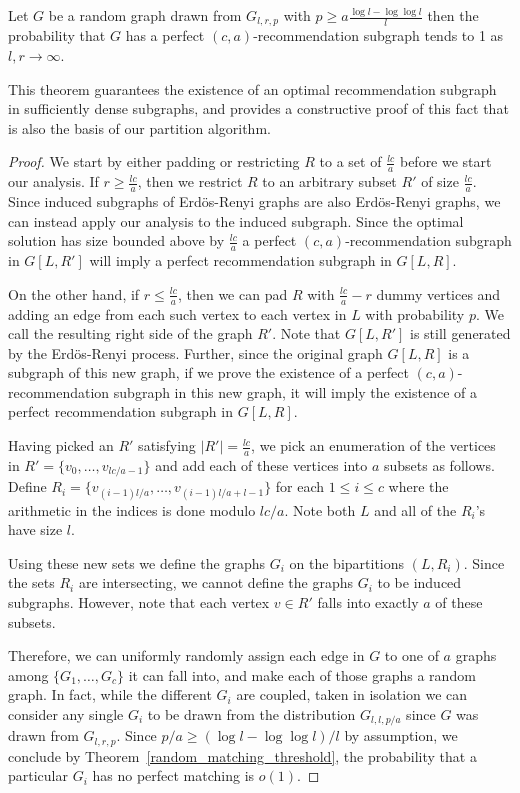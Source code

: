 \begin{thm}\label{perfect}
Let $G$ be a random graph drawn from $G_{l, r, p}$ with $p\geq a\frac{\log l-\log\log
l}{l}$ then the probability that $G$ has a perfect $(c, a)$-recommendation
subgraph tends to 1 as $l,r\to\infty$.
\end{thm}

This theorem guarantees the existence of an optimal recommendation subgraph in sufficiently dense subgraphs, and provides a constructive proof of this fact that is also the basis of our partition algorithm. \vs

\begin{proof}
We start by either padding or restricting $R$ to a set of $\frac{lc}{a}$ before we
start our analysis. If $r\geq\frac{lc}{a}$, then we restrict $R$
to an arbitrary subset $R'$ of size $\frac{lc}{a}$. Since induced subgraphs of
Erd\"{o}s-Renyi graphs are also Erd\"{o}s-Renyi graphs, we can instead
apply our analysis to the induced subgraph. Since the optimal
solution has size bounded above by $\frac{lc}{a}$ a perfect $(c,a)$-recommendation
subgraph in $G[L,R']$ will imply a perfect recommendation subgraph in $G[L,R]$. \vs

On the other hand, if $r \leq\frac{lc}{a}$, then we can pad $R$ with $\frac{lc}{a}-r$
dummy vertices and adding an edge from each such vertex to each vertex in $L$
with probability $p$. We call the resulting right side of the graph $R'$.
Note that $G[L,R']$ is still generated by the Erd\"{o}s-Renyi process. Further,
since the original graph $G[L,R]$ is a subgraph of this new graph, if we prove
the existence of a perfect $(c,a)$-recommendation subgraph in this new graph, it
will imply the existence of a perfect recommendation subgraph in $G[L,R]$. \vs

Having picked an $R'$ satisfying $|R'|=\frac{lc}{a}$, we pick an enumeration
of the vertices in $R'=\{v_0,\ldots, v_{lc/a-1}\}$
and add each of these vertices into $a$ subsets as follows. Define
$R_i = \{v_{(i-1)l/a}, \ldots, v_{(i-1)l/a+l-1}\}$ for each $1\leq i\leq c$ where
the arithmetic in the indices is done modulo $lc/a$. Note both $L$ and all of
the $R_i$'s have size $l$. \vs

Using these new sets we define the graphs $G_i$ on the bipartitions
$(L, R_i)$. Since the sets $R_i$ are intersecting, we cannot define the
graphs $G_i$ to be induced subgraphs. However, note that each vertex $v\in R'$
falls into exactly $a$ of these subsets. \vs

Therefore, we can uniformly randomly assign each edge in $G$ to one of $a$ graphs among $\{G_1,\ldots, G_c\}$ it can fall into,
and make each of those graphs a random graph. In fact, while the different
$G_i$ are coupled, taken in isolation we can consider any single $G_i$ to be
drawn from the distribution $G_{l,l,p/a}$ since $G$ was drawn from $G_{l,r,p}$.
Since $p/a \geq (\log l - \log\log l)/l$ by assumption, we conclude by
Theorem~\ref{random_matching_threshold}, the probability that a particular
$G_i$ has no perfect matching is $o(1)$. \vs


\end{proof}
